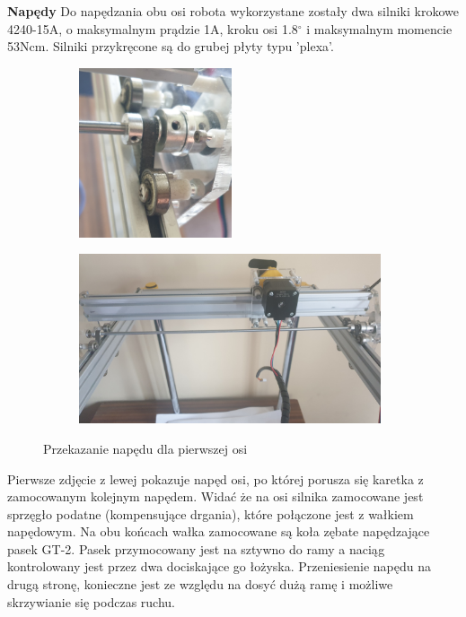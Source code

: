 \textbf{Napędy} \newline
Do napędzania obu osi robota wykorzystane zostały dwa silniki krokowe 4240-15A, o maksymalnym prądzie 1A, kroku osi 1.8$^\circ$ i maksymalnym momencie 53Ncm.
Silniki przykręcone są do grubej płyty typu 'plexa'.
\begin{figure}[H]
	\centering
	\begin{subfigure}{}
		\includegraphics[height=5cm]{pages/dodatekARobot/img/przeniesienieNapedu.jpg}
	\end{subfigure}
	\begin{subfigure}{}
		\includegraphics[height=5cm]{pages/dodatekARobot/img/ramaNapedCaly.jpg}
	\end{subfigure}
	\caption{Przekazanie napędu dla pierwszej osi}
\end{figure}
Pierwsze zdjęcie z lewej pokazuje napęd osi, po której porusza się karetka z zamocowanym kolejnym napędem. Widać że na osi silnika 
zamocowane jest sprzęgło podatne (kompensujące drgania), które połączone jest z wałkiem napędowym. 
Na obu końcach wałka zamocowane są koła zębate napędzające pasek GT-2. Pasek przymocowany jest na sztywno do ramy a naciąg kontrolowany jest przez
dwa dociskające go łożyska. Przeniesienie napędu na drugą stronę, konieczne jest ze względu na dosyć dużą ramę i możliwe skrzywianie się podczas ruchu.
